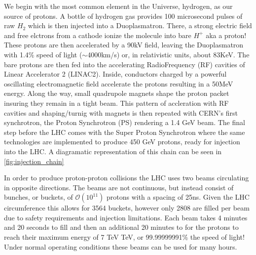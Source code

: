We begin with the most common element in the Universe, hydrogen, as our source
of protons.  A bottle of hydrogen gas provides 100 microsecond pulses of raw
$H_{2}$ which is then injected into a Duoplasmatron. There,  a strong electric
field and free elctrons from a cathode ionize the molecule into bare $H^{+}$ aka
a proton!  These protons are then accelerated by a 90kV field, leaving the
Duoplasmatron with 1.4\% speed of light ($\sim$4000km/s) or, in relativistic
units, about 83KeV. The bare protons are then fed into the accelerating
RadioFrequency (RF) cavities of Linear Accelerator 2 (LINAC2). Inside,
conductors charged by a powerful oscillating electromagnetic field accelerate
the protons resulting in a 50MeV energy. Along the way, small quadrupole magnets
shape the proton packet insuring they remain in a tight beam.  This pattern of
accleration with RF cavities and shaping/turnig with magnets is then repeated
with CERN's first synchrotron, the Proton Synchrotron (PS) rendering a 1.4 GeV
beam.  The final step before the LHC comes with the Super Proton Synchrotron
where the same technologies are implemented to produce 450 GeV protons, ready
for injection into the LHC. A diagramatic representation of this chain can be
seen in \cref{fig:injection_chain} 

In order to produce proton-proton collisions the LHC uses two beams circulating
in opposite directions.  The beams are not continuous, but instead consist of
bunches, or buckets, of $\mathcal{O}(10^{11})$ protons with a spacing of 25ns.
Given the LHC circumference this allows for 3564 buckets, however only 2808 are
filled per beam due to safety requirements and injection limitations.  Each beam
takes 4 minutes and 20 seconds to fill and then an additional 20 minutes to for
the protons to reach their maximum energy of 7 TeV TeV, or 99.99999991\% the
speed of light! Under normal operating conditions these beams can be used for
many hours.
